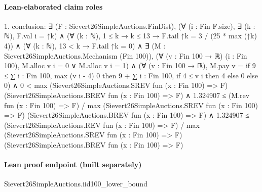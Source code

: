 \documentclass[10pt]{article}
\begin{document}
\paragraph{Lean-elaborated claim roles}\begin{ReviewVerbatim}
1. conclusion: ∃ (F : Sievert26SimpleAuctions.FinDist),
  (∀ (i : Fin F.size), ∃ (k : ℕ), F.val i = ↑k) ∧
    (∀ (k : ℕ), 1 ≤ k → k ≤ 13 → F.tail ↑k = 3 / (25 * max (↑k) 4)) ∧
      (∀ (k : ℕ), 13 < k → F.tail ↑k = 0) ∧
        ∃ (M : Sievert26SimpleAuctions.Mechanism (Fin 100)),
          (∀ (v : Fin 100 → ℝ) (i : Fin 100), M.alloc v i = 0 ∨ M.alloc v i = 1) ∧
            (∀ (v : Fin 100 → ℝ),
                M.pay v =
                  if 9 ≤ ∑ i : Fin 100, max (v i - 4) 0 then 9 + ∑ i : Fin 100, if 4 ≤ v i then 4 else 0 else 0) ∧
              0 <
                  max (Sievert26SimpleAuctions.SREV fun (x : Fin 100) => F)
                    (Sievert26SimpleAuctions.BREV fun (x : Fin 100) => F) ∧
                1.324907 ≤
                    (M.rev fun (x : Fin 100) => F) /
                      max (Sievert26SimpleAuctions.SREV fun (x : Fin 100) => F)
                        (Sievert26SimpleAuctions.BREV fun (x : Fin 100) => F) ∧
                  1.324907 ≤
                    (Sievert26SimpleAuctions.REV fun (x : Fin 100) => F) /
                      max (Sievert26SimpleAuctions.SREV fun (x : Fin 100) => F)
                        (Sievert26SimpleAuctions.BREV fun (x : Fin 100) => F)
\end{ReviewVerbatim}

\paragraph{Lean proof endpoint (built separately)}\begin{ReviewVerbatim}
Sievert26SimpleAuctions.iid100_lower_bound
\end{ReviewVerbatim}
\end{document}
